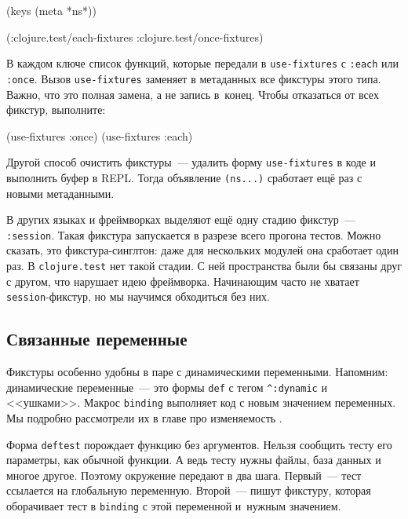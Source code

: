 \begin{english}
  \begin{clojure}
(keys (meta *ns*))

(:clojure.test/each-fixtures
 :clojure.test/once-fixtures)
  \end{clojure}
\end{english}

В каждом ключе список функций, которые передали в \texttt{use\--fix\-tur\-es} с
\verb|:each| или \verb|:once|. Вызов \verb|use-fixtures| заменяет в метаданных
все фикстуры этого типа. Важно, что это полная замена, а не запись
в~конец. Чтобы отказаться от всех фикстур, выполните:

\begin{english}
  \begin{clojure}
(use-fixtures :once)
(use-fixtures :each)
  \end{clojure}
\end{english}

Другой способ очистить фикстуры~--- удалить форму \texttt{use\--fix\-tu\-res} в коде и
выполнить буфер в REPL. Тогда объявление \verb|(ns...)|
сработает ещё раз с новыми метаданными.

\label{fix-session}

В других языках и фреймворках выделяют ещё одну стадию фикстур~---
\verb|:session|. Такая фикстура запускается в разрезе всего прогона
тестов. Можно сказать, это фикстура-синглтон: даже для нескольких модулей она
сработает один раз. В \verb|clojure.test| нет такой стадии. С ней пространства
были бы связаны друг с другом, что нарушает идею фреймворка. Начинающим часто не
хватает \verb|session|-фикстур, но мы научимся обходиться без них.

\subsection{Связанные переменные}


Фикстуры особенно удобны в паре с динамическими переменными. Напомним:
динамические переменные~--- это формы \verb|def| с тегом \verb|^:dynamic| и
<<ушками>>. Макрос \verb|binding| выполняет код с новым значением переменных. Мы
подробно рассмотрели их в главе про изменяемость .

Форма \verb|deftest| порождает функцию без аргументов. Нельзя сообщить тесту его
параметры, как обычной функции. А ведь тесту нужны файлы, база данных и многое
другое. Поэтому окружение передают в два шага. Первый~--- тест ссылается на
глобальную переменную. Второй~--- пишут фикстуру, которая оборачивает тест в
\verb|binding| с этой переменной и~нужным значением.

